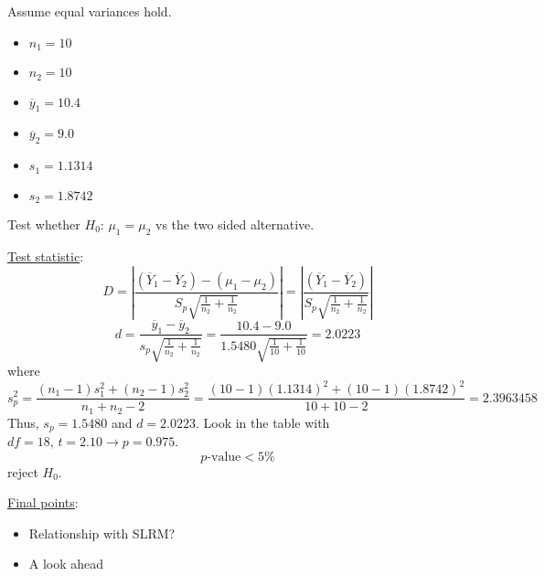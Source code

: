 \begin{exbox}
    \begin{example} Assume equal variances hold.
        \begin{itemize}
            \item $ n_1=10 $
            \item $ n_2=10 $
            \item $ \overline{y}_1=10.4 $
            \item $ \overline{y}_2=9.0 $
            \item $ s_1=1.1314 $
            \item $ s_2=1.8742 $
        \end{itemize}
        Test whether $ H_0 $: $ \mu_1=\mu_2 $ vs the two sided alternative.

        \underline{Test statistic}:
        \[ D=\left|\frac{(\overline{Y}_1-\overline{Y}_2)-(\mu_1-\mu_2)}{S_p\sqrt{\frac{1}{n_2}+\frac{1}{n_2}}}\right|=
            \left|\frac{(\overline{Y}_1-\overline{Y}_2)}{S_p\sqrt{\frac{1}{n_2}+\frac{1}{n_2}}}\right| \]
        \[ d=\frac{\overline{y}_1-\overline{y}_2}{s_p\sqrt{\frac{1}{n_2}+\frac{1}{n_2}}}=
            \frac{10.4-9.0}{1.5480\sqrt{\frac{1}{10}+\frac{1}{10}}}=2.0223  \]
        where
        \[ s_p^2=\frac{(n_1-1)s_1^2+(n_2-1)s_2^2}{n_1+n_2-2}=\frac{(10-1)(1.1314)^2+(10-1)(1.8742)^2}{10+10-2}=2.3963458  \]
        Thus, $ s_p=1.5480 $ and $ d=2.0223 $. Look in the table with $ df=18,\,t=2.10 \rightarrow
            p=0.975$.
        \[ p\text{-value}<5\% \]
        reject $ H_0 $.
    \end{example}
\end{exbox}

\underline{Final points}:
\begin{itemize}
    \item Relationship with SLRM?
    \item A look ahead
\end{itemize}
